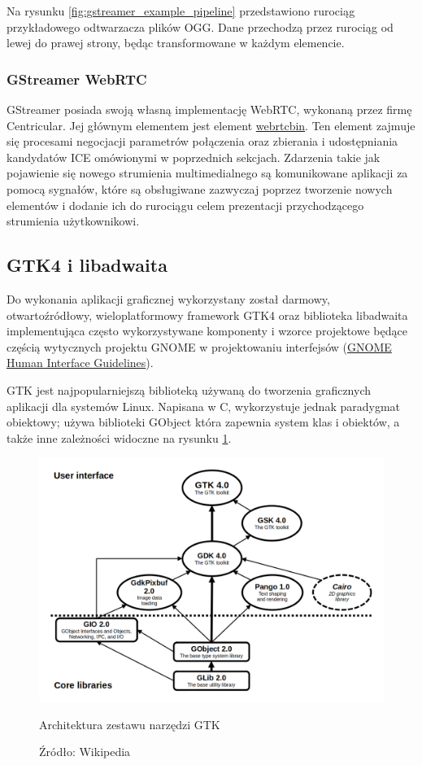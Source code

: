 Na rysunku \ref{fig:gstreamer_example_pipeline} przedstawiono rurociąg przykładowego odtwarzacza plików
OGG. Dane przechodzą przez rurociąg od lewej do prawej strony, będąc transformowane w każdym
elemencie.

\subsubsection{GStreamer WebRTC}
\label{gstreamer_webrtc}

GStreamer posiada swoją własną implementację WebRTC, wykonaną przez firmę Centricular. Jej głównym
elementem jest element
\href{https://gstreamer.freedesktop.org/documentation/webrtc/index.html?gi-language=c}{webrtcbin}.
Ten element zajmuje się procesami negocjacji parametrów połączenia oraz zbierania i udostępniania
kandydatów ICE omówionymi w poprzednich sekcjach. Zdarzenia takie jak pojawienie się nowego
strumienia multimedialnego są komunikowane aplikacji za pomocą sygnałów, które są obsługiwane
zazwyczaj poprzez tworzenie nowych elementów i dodanie ich do rurociągu celem prezentacji
przychodzącego strumienia użytkownikowi.

\subsection{GTK4 i libadwaita}

Do wykonania aplikacji graficznej wykorzystany został darmowy, otwartoźródłowy, wieloplatformowy
framework GTK4 oraz biblioteka libadwaita implementująca często wykorzystywane komponenty i wzorce
projektowe będące częścią wytycznych projektu GNOME w projektowaniu interfejsów
(\href{https://developer.gnome.org/hig/}{GNOME Human Interface Guidelines}).

GTK jest najpopularniejszą biblioteką używaną do tworzenia graficznych aplikacji dla systemów Linux.
Napisana w C, wykorzystuje jednak paradygmat obiektowy; używa biblioteki GObject która zapewnia
system klas i obiektów, a także inne zależności widoczne na rysunku \ref{fig:gtk_toolkit}.

\begin{figure}[H]
    \centering
    \includegraphics[width=.7\textwidth]{img/gtk-toolkit}
    \caption{Architektura zestawu narzędzi GTK}
    \caption*{Źródło: Wikipedia \cite{wiki:gtk}}
    \label{fig:gtk_toolkit}
\end{figure}


